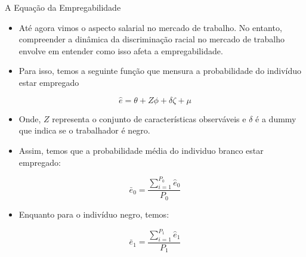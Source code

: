 \documentclass[10pt, xcolor=x11names,compress]{beamer}
\begin{document}
	\begin{frame}{A Equação da Empregabilidade}
		\begin{itemize}
			\item Até agora vimos o aspecto salarial no mercado de trabalho. No entanto, compreender a dinâmica da discriminação racial no mercado de trabalho envolve em entender como isso afeta a empregabilidade.
			\item Para isso, temos a seguinte função que mensura a probabilidade do indivíduo estar empregado
		\end{itemize}
		\begin{equation}
			\hat{e} = \theta + Z\phi + \delta\zeta + \mu
		\end{equation}
		\begin{itemize}
			\item Onde, $Z$ representa o conjunto de características observáveis e $\delta$ é a dummy que indica se o trabalhador é negro.
			\item Assim, temos que a probabilidade média do individuo branco estar empregado:
		\end{itemize}
		\begin{equation}
			\bar{e}_{0} = \frac{\sum_{i=1}^{P_{0}} \hat{e}_{0}}{P_{0}}
		\end{equation}
			\begin{itemize}
			\item Enquanto para o indivíduo negro, temos:
		\end{itemize}
		\begin{equation}
			\bar{e}_{1} = \frac{\sum_{i=1}^{P_{1}} \hat{e}_{1}}{P_{1}}
		\end{equation}
	\end{frame}
	
\end{document}
